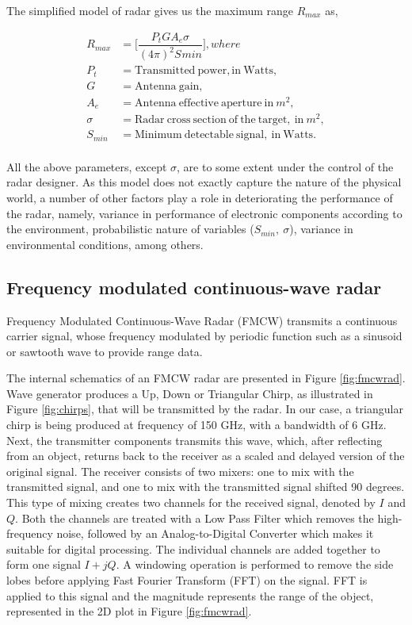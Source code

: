 The simplified model of radar gives us the maximum range $R_{max}$ as,

\begin{equation}\label{radmodel}
\begin{aligned}
R_{max}&=\bigg[ \dfrac{P_{t}GA_{e}\sigma}{(4\pi)^2S_{}min}\bigg],       where\\
P_{t} &= \mathrm{Transmitted\ power, in \ Watts,}\\
G &= \mathrm{Antenna\ gain},\\
A_{e} &= \mathrm{Antenna\  effective \ aperture \ in}\ m^2,\\
\sigma &= \mathrm{Radar \ cross \ section \ of \ the \ target,\ in} \ m^2, \\
S_{min} &= \mathrm{Minimum \ detectable \ signal, \ in \ Watts}.\\
\end{aligned}
\end{equation}




All the above parameters, except $\sigma$, are to some extent under the control of the radar designer. As this model does not exactly capture the nature of the physical world, a number of other factors play a role in deteriorating the performance of the radar, namely, variance in performance of electronic components according to the environment, probabilistic nature of variables ($S_{min},\  \sigma$), variance in environmental conditions, among others.

\subsection{Frequency modulated continuous-wave radar}
Frequency Modulated Continuous-Wave Radar (FMCW) transmits a continuous carrier signal, whose frequency modulated by periodic function such as a sinusoid or sawtooth wave to provide range data. 

The internal schematics of an FMCW radar are presented in Figure \ref{fig:fmcwrad}. Wave generator produces a Up, Down or Triangular Chirp, as illustrated in Figure \ref{fig:chirps}, that will be transmitted by the radar. In our case, a triangular chirp is being produced at frequency of 150 GHz, with a bandwidth of 6 GHz. Next, the transmitter components transmits this wave, which, after reflecting from an object, returns back to the receiver as a scaled and delayed version of the original signal. The receiver consists of two mixers: one to mix with the transmitted signal, and one to mix with the transmitted signal shifted 90 degrees. This type of mixing creates two channels for the received signal, denoted by $I$ and $Q$. Both the channels are treated with a Low Pass Filter which removes the high-frequency noise, followed by an Analog-to-Digital Converter which makes it suitable for digital processing. The individual channels are added together to form one signal $I+jQ$. A windowing operation is performed to remove the side lobes before applying Fast Fourier Transform (FFT) on the signal. FFT  is applied to this signal and the magnitude represents the range of the object, represented in the 2D plot in Figure \ref{fig:fmcwrad}. 

